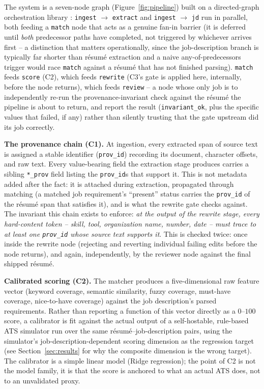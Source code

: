 \documentclass{article}
\begin{document}
The system is a seven-node graph (Figure~\ref{fig:pipeline}) built on a directed-graph
orchestration library \citep{langgraph2024}: \texttt{ingest} $\to$ \texttt{extract} and
\texttt{ingest} $\to$ \texttt{jd} run in parallel, both feeding a \texttt{match} node that acts as a
genuine fan-in barrier (it is deferred until \emph{both} predecessor paths have completed, not
triggered by whichever arrives first -- a distinction that matters operationally, since the
job-description branch is typically far shorter than résumé extraction and a naive
any-of-predecessors trigger would race \texttt{match} against a résumé that has not finished
parsing). \texttt{match} feeds \texttt{score} (C2), which feeds \texttt{rewrite} (C3's gate is
applied here, internally, before the node returns), which feeds \texttt{review} -- a node whose
only job is to independently re-run the provenance-invariant check against the résumé the pipeline
is about to return, and report the result (\texttt{invariant\_ok}, plus the specific values that
failed, if any) rather than silently trusting that the gate upstream did its job correctly.

\textbf{The provenance chain (C1).} At ingestion, every extracted span of source text is assigned
a stable identifier (\texttt{prov\_id}) recording its document, character offsets, and raw text.
Every value-bearing field the extraction stage produces carries a sibling \texttt{*\_prov} field
listing the \texttt{prov\_id}s that support it. This is not metadata added after the fact: it is
attached during extraction, propagated through matching (a matched job requirement's ``present''
status carries the \texttt{prov\_id} of the résumé span that satisfies it), and is what the
rewrite gate checks against. The invariant this chain exists to enforce: \emph{at the output of the
rewrite stage, every hard-content token -- skill, tool, organization name, number, date -- must
trace to at least one \texttt{prov\_id} whose source text supports it}. This is checked twice: once
inside the rewrite node (rejecting and reverting individual failing edits before the node returns),
and again, independently, by the reviewer node against the final shipped résumé.

\textbf{Calibrated scoring (C2).} The matcher produces a five-dimensional raw feature vector
(keyword coverage, semantic similarity, fuzzy coverage, must-have coverage, nice-to-have coverage)
against the job description's parsed requirements. Rather than reporting a function of this vector
directly as a $0$--$100$ score, a calibrator is fit against the actual output of a self-hostable,
rule-based ATS simulator \citep{atsscreener} run over the same résumé--job-description pairs, using
the simulator's job-description-dependent scoring dimension as the regression target (see
Section~\ref{sec:results} for why the composite dimension is the wrong target). The calibrator is
a simple linear model (Ridge regression); the point of C2 is not the model family, it is that the
score is anchored to what an actual ATS does, not to an unvalidated proxy.
\end{document}
